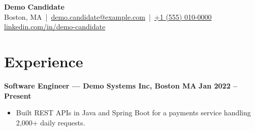 \documentclass[10pt,letterpaper]{article}
\begin{document}
\begin{center}
  {\Large \textbf{Demo Candidate}}\\
  Boston, MA \,|\, \href{mailto:demo.candidate@example.com}{demo.candidate@example.com} \,|\, \href{tel:+1-555-010-0000}{+1 (555) 010-0000}\\
  \href{https://linkedin.com/in/demo-candidate}{linkedin.com/in/demo-candidate}
\end{center}

\section{Experience}
\textbf{Software Engineer — Demo Systems Inc, Boston MA} \hfill \textbf{Jan 2022 – Present}
\begin{itemize}
\item Built REST APIs in Java and Spring Boot for a payments service handling 2,000+ daily requests.
\end{itemize}
\end{document}
